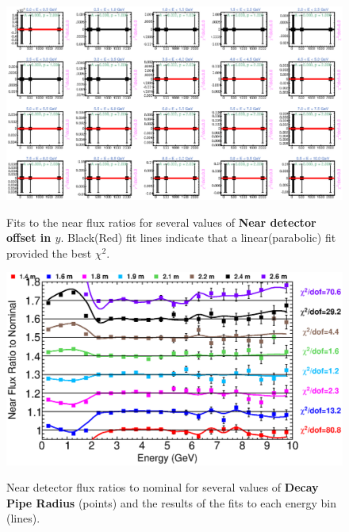 \begin{figure}[ht]
  \begin{center}
    {\includegraphics[width=5.0in]{figures/LBNEFDY_near_fits.eps}}
  \end{center}
\caption{ Fits to the near flux ratios for several values of {\bf Near detector offset in $y$}. Black(Red) fit lines indicate that a linear(parabolic) fit provided the best $\chi^2$. }
\end{figure}

\begin{figure}[ht]
  \begin{center}
    {\includegraphics[width=6.0in]{figures/DecayPipeRadius_near_summary.eps}}
  \end{center}
\caption{ Near detector flux ratios to nominal for several values of {\bf Decay Pipe Radius} (points) and the results of the fits to each energy bin (lines).}
\end{figure}

